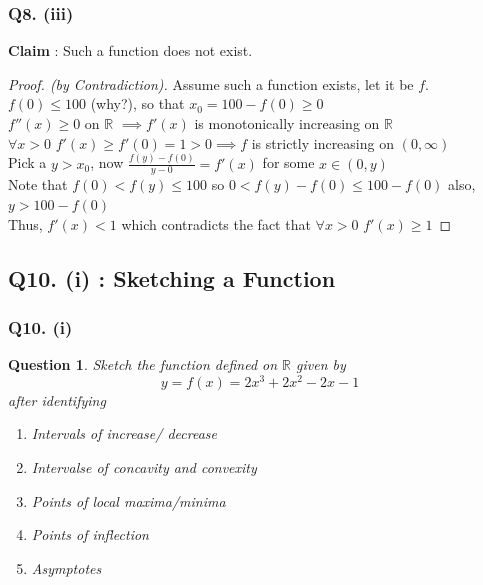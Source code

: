 \documentclass[handout,aspectratio=169]{beamer}
\newtheorem{qsn}{Question}
\newcommand{\bR}{\mathbb{R}}
\begin{document}
\begin{frame}
\frametitle{Q8. (iii)}
\textbf{Claim} : Such a function does not exist.
\pause
\begin{proof}[Proof. (by Contradiction)]
Assume such a function exists, let it be $f$. \\ \pause
$f(0)\leq 100$ (why?), so that $x_0 = 100-f(0) \geq 0$ \\ \pause
$f''(x)\geq 0$ on $\bR$ $\implies f'(x)$ is monotonically increasing on $\bR$ \\ \pause
$\forall x>0 \,\, f'(x)\geq f'(0) = 1 > 0 \implies f$ is strictly increasing on $(0,\infty)$ \\ 
Pick a $y>x_0$, now $\frac{f(y)-f(0)}{y-0} = f'(x)$ for some $x\in (0,y)$ \\
Note that $f(0)<f(y)\leq 100$ so $0 < f(y)-f(0) \leq 100-f(0)$ also, $y>100-f(0)$ \\
Thus, $f'(x)<1$ which contradicts the fact that $\forall x>0 \,\,f'(x)\geq 1$
\end{proof}
\end{frame}

\subsection{Q10. (i) : Sketching a Function}

\begin{frame}
\pause
\frametitle{Q10. (i)}
\begin{qsn}
Sketch the function defined on $\bR$ given by \pause
$$y=f(x)=2x^3+2x^2-2x-1$$ \pause
after identifying \pause
\begin{enumerate}
\item Intervals of increase/ decrease \pause
\item Intervalse of concavity and convexity \pause
\item Points of local maxima/minima \pause
\item Points of inflection \pause
\item Asymptotes 
\end{enumerate}
\end{qsn}
\end{frame}
\end{document}
